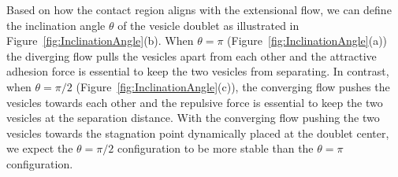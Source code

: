 \documentclass[prf,superscriptaddress,showkeys,longbibliography]{revtex4-1}
\begin{document}
Based on how the contact region aligns with the extensional flow, we can
define the inclination angle $\theta$ of the vesicle doublet as illustrated in
Figure~\ref{fig:InclinationAngle}(b). When $\theta=\pi$ (Figure~\ref{fig:InclinationAngle}(a))
the diverging flow
pulls the vesicles apart from each other and the attractive adhesion
force is essential to keep the two vesicles from separating.  In
contrast, when $\theta = \pi/2$ (Figure~\ref{fig:InclinationAngle}(c)), 
the converging flow pushes the vesicles towards
each other and the repulsive force is essential to keep the
two vesicles at the separation distance.  With the converging flow
pushing the two vesicles towards the stagnation point dynamically placed
at the doublet center, we expect the $\theta=\pi/2$ configuration to be more stable
than the $\theta=\pi$ configuration. 
%
\end{document}
